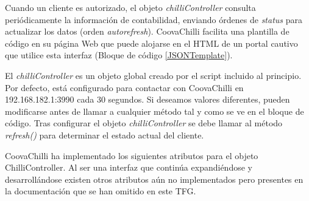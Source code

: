 
Cuando un cliente es autorizado, el objeto \emph{chilliController} consulta periódicamente la información de contabilidad, enviando órdenes de \emph{status} para actualizar los datos (orden \emph{autorefresh}).
CoovaChilli facilita una plantilla de código en su página Web que puede alojarse en el HTML de un portal cautivo que utilice esta interfaz (Bloque de código \ref{JSONTemplate}).

El \emph{chilliController} es un objeto global creado por el script incluido al principio. Por defecto, está configurado para contactar con CoovaChilli en 192.168.182.1:3990 cada 30 segundos. Si deseamos valores diferentes, pueden modificarse antes de llamar a cualquier método tal y como se ve en el bloque de código. Tras configurar el objeto \emph{chilliController} se debe llamar al método \emph{refresh()} para determinar el estado actual del cliente.

CoovaChilli ha implementado los siguientes atributos para el objeto ChilliController. Al ser una interfaz que continúa expandiéndose y desarrollándose existen otros atributos aún no implementados pero presentes en la documentación que se han omitido en este TFG.

